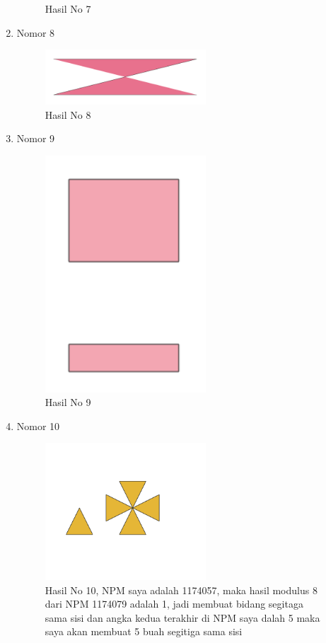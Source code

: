 \begin{enumerate}
\begin{figure}[H]
		\centering
		\caption{Hasil No 7}
	\end{figure}
	\item Nomor 8
	
	\begin{figure}[H]
		\includegraphics[width=6cm]{figures/1174057/alit8.PNG}
		\centering
		\caption{Hasil No 8}
	\end{figure}
	\item Nomor 9
	
	\begin{figure}[H]
		\includegraphics[width=6cm]{figures/1174057/alit9.PNG}
		\centering
		\caption{Hasil No 9}
	\end{figure}
	\item Nomor 10
	
	\begin{figure}[H]
		\includegraphics[width=6cm]{figures/1174057/soal10.PNG}
		\centering
		\caption{Hasil No 10, NPM saya adalah 1174057, maka hasil modulus 8 dari NPM 1174079 adalah 1, jadi membuat bidang segitaga sama sisi dan angka kedua terakhir di NPM saya dalah 5 maka saya akan membuat 5 buah segitiga sama sisi}
	\end{figure}
\end{enumerate}
